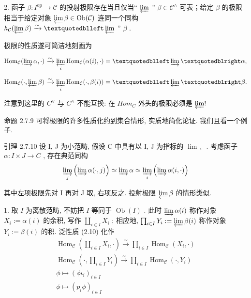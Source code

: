 \documentclass[]{article}
\begin{document}
2. 函子 $\beta: I^{\mathrm{op}} \to \mathcal{C}$ 的投射极限存在当且仅当“ $\varprojlim$ ” $\beta \in \mathcal{C}^{\wedge}$ 可表；给定 $\beta$ 的极限相当于给定对象 $\varprojlim \beta \in \mathrm{Ob}(\mathcal{C})$ 连同一个同构 $h_{\mathcal{C}}(\varprojlim \beta) \xrightarrow{\sim} “\varprojlim$ ” $\beta$ . 

极限的性质遂可简洁地刻画为 

$$
\operatorname{Hom} _ {\mathcal {C}} (\varinjlim \alpha , \cdot) \xrightarrow {\sim} \varprojlim_ {i} \operatorname{Hom} _ {\mathcal {C}} (\alpha (i), \cdot) = “ \varinjlim ” \alpha ,
$$

$$
\mathrm{Hom} _ {\mathcal {C}} (\cdot , \varprojlim \beta) \xrightarrow {\sim} \varprojlim_ {i} \mathrm{Hom} _ {\mathcal {C}} (\cdot , \beta (i)) = “ \varprojlim ” \beta .
$$

注意到这里的 $C^{\vee}$ 与 $C^{\wedge}$ 不能互换: 在 $Hom_{C}$ 外头的极限必须是 $\varprojlim!$ 

命题 2.7.9 可将极限的许多性质化约到集合情形, 实质地简化论证. 我们且看一个例子. 

引理 2.7.10 设 I, J 为小范畴, 假设 C 中具有以 I, J 为指标的 $\lim_{\rightarrow}$ . 考虑函子 $\alpha: I \times J \to C$ , 存在典范同构 $$
\varinjlim_ {j} \left(\varinjlim \alpha (\cdot , j)\right) \simeq \varinjlim \alpha \simeq \varinjlim_ {i} \left(\varinjlim \alpha (i, \cdot)\right)
$$

其中左项极限先对 I 再对 J 取, 右项反之. 投射极限 $\varprojlim\beta$ 的情形类似. 

1. 取 $I$ 为离散范畴, 不妨把 $I$ 等同于 $\operatorname{Ob}(I)$ . 此时 $\varinjlim \alpha(i)$ 称作对象 $X_{i} := \alpha(i)$ 的余积, 写作 $\coprod_{i \in I} X_{i}$ ; 相应地, $\prod_{i \in I} Y_{i} := \varprojlim \beta(i)$ 称作对象 $Y_{i} := \beta(i)$ 的积. 泛性质 (2.10) 化作 $$
\begin{array}{l} \operatorname{Hom} _ {\mathcal {C}} \left(\coprod_ {i \in I} X _ {i}, \cdot\right) \xrightarrow {\sim} \prod_ {i \in I} \operatorname{Hom} _ {\mathcal {C}} (X _ {i}, \cdot) \\ \operatorname{Hom} _ {\mathcal {C}} \left(\cdot , \prod_ {i \in I} Y _ {i}\right) \xrightarrow {\sim} \prod_ {i \in I} \operatorname{Hom} _ {\mathcal {C}} (\cdot , Y _ {i}) \\ \phi \longmapsto (\phi \iota_ {i}) _ {i \in I} \\ \phi \longmapsto (p _ {i} \phi) _ {i \in I} \\ \end{array}
$$
\end{document}

